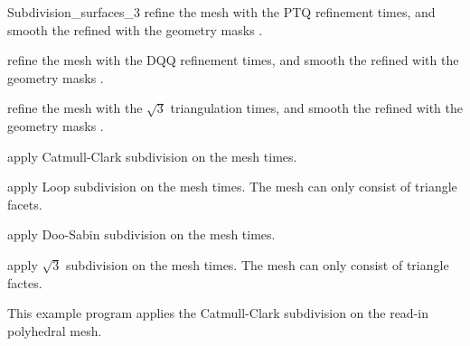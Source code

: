 \begin{ccRefClass}{Subdivision_surfaces_3}
{refine the mesh  with the PTQ refinement 
 times, and smooth the refined  with the geometry 
masks .}

{refine the mesh  with the DQQ refinement 
 times, and smooth the refined  with the geometry 
masks .}

{refine the mesh  with the $\sqrt{3}$ triangulation 
 times, and smooth the refined  with the geometry 
masks .}

\ccSeeAlso



\ccThree{}{}{}

{apply Catmull-Clark subdivision on the mesh   times.}

{apply Loop subdivision on the mesh   times. 
The mesh  can only consist of triangle facets.}

{apply Doo-Sabin subdivision on the mesh   times.}

{apply $\sqrt{3}$ subdivision on the mesh   times.
The mesh  can only consist of triangle factes.}

\ccExample

This example program applies the Catmull-Clark subdivision on the
read-in polyhedral mesh.


\end{ccRefClass}

\ccRefPageEnd
